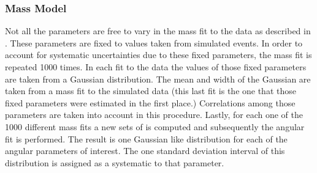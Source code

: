 \subsubsection{\mJpsiKpi Mass Model}
\label{systMassModel}
Not all the \pdf parameters are free to vary in the mass fit to the data as described in .
These parameters are fixed to values taken from simulated events.
In order to account for systematic uncertainties due to these fixed parameters, the mass fit is repeated 1000 times. In each fit
to the data the values of those fixed parameters are taken from a Gaussian distribution. The mean and width of the Gaussian are
taken from a mass fit to the simulated data (this last fit is the one that those fixed parameters were estimated in the first place.)
Correlations among those parameters are taken into account in this procedure. Lastly, for each one of the 1000 different mass fits
a new sets of \sWeights is computed and subsequently the angular fit is performed. The result is one Gaussian like distribution
for each of the angular parameters of interest. The one standard deviation interval of this distribution is assigned as a systematic to that parameter.

